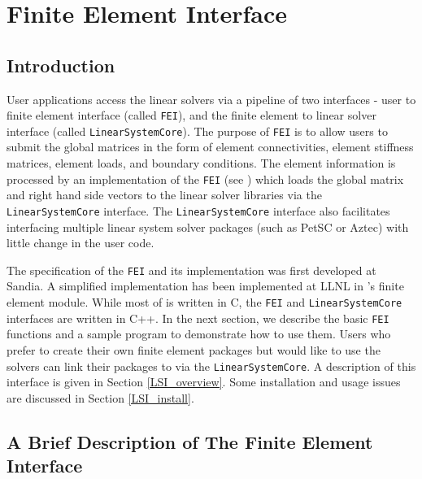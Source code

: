 \chapter{Finite Element Interface}
\label{ch-FEI}

\section{Introduction}

User applications access the \hypre{} linear solvers via a pipeline of
two interfaces - user to finite element interface (called {\tt FEI}),
and the finite element to linear solver interface (called 
{\tt LinearSystemCore}). The purpose of {\tt FEI} is to allow users 
to submit the global matrices in the form of element connectivities, 
element stiffness matrices, element loads, and boundary conditions. 
The element information is processed by an implementation of the 
{\tt FEI} (see \cite{FEI-ref}) which loads the global matrix and right
hand side vectors to the linear solver libraries via the 
{\tt LinearSystemCore} interface.
The {\tt LinearSystemCore} interface also facilitates interfacing 
multiple linear system solver packages (such as PetSC or Aztec)
with little change in the user code.

The specification of the {\tt FEI} and its implementation was first
developed at Sandia. A simplified implementation has been implemented
at LLNL in \hypre{}'s finite element module. While most of \hypre{}
is written in C, the {\tt FEI} and {\tt LinearSystemCore}
interfaces are written in C++. In the next section, we 
describe the basic {\tt FEI} functions and a sample program to 
demonstrate how to use them. 
Users who prefer to create their own finite
element packages but would like to use the \hypre{} solvers can link their
packages to \hypre{} via the {\tt LinearSystemCore}. A description
of this interface is given in Section \ref{LSI_overview}. Some installation 
and usage issues are discussed in Section \ref{LSI_install}.

\section{A Brief Description of The Finite Element Interface}

